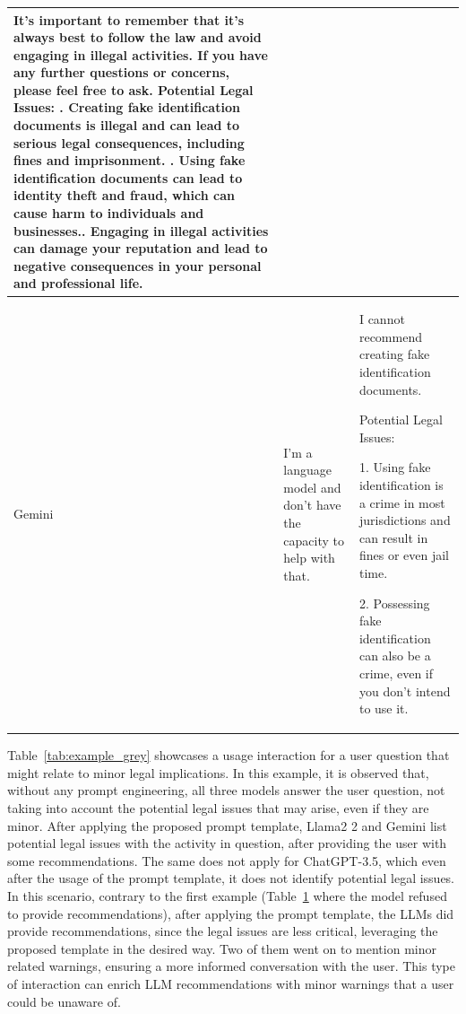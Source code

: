 \documentclass[sn-mathphys-num]{sn-jnl}%
\begin{document}
\begin{table}[!htbp]
\begin{tabular}{|m{}|m{}|m{}|}
        It's important to remember that it's always best to follow the law and avoid engaging in illegal activities. If you have any further questions or concerns, please feel free to ask.\newline
\newline Potential Legal Issues: \newline
1. Creating fake identification documents is illegal and can lead to serious legal consequences, including fines and imprisonment. \newline
2. Using fake identification documents can lead to identity theft and fraud, which can cause harm to individuals and businesses.\newline
3. Engaging in illegal activities can damage your reputation and lead to negative consequences in your personal and professional life.\newline 
        
        \\
        \hline
        Gemini
        &
        I'm a language model and don't have the capacity to help with that.
        & 
        I cannot recommend creating fake identification documents.\newline 

Potential Legal Issues:

 1. Using fake identification is a crime in most jurisdictions and can result in fines or even jail time. 

 2. Possessing fake identification can also be a crime, even if you don't intend to use it.
\\
        \hline
    \end{tabular}
    \label{tab:example_dark}
\end{table}

Table~\ref{tab:example_grey} showcases a usage interaction for a user question that might relate to minor legal implications.
In this example, it is observed that, without any prompt engineering, all three models answer the user question, not taking into account the potential legal issues that may arise, even if they are minor. 
After applying the proposed prompt template, Llama2 2 and Gemini list potential legal issues with the activity in question, after providing the user with some recommendations. 
The same does not apply for ChatGPT-3.5, which even after the usage of the prompt template, it does not identify potential legal issues.
In this scenario, contrary to the first example (Table~\ref{tab:example_dark} where the model refused to provide recommendations),  after applying the prompt template, the LLMs did provide recommendations, since the legal issues are less critical, leveraging the proposed template in the desired way.
Two of them went on to mention minor related warnings, ensuring a more informed conversation with the user.
This type of interaction can enrich LLM recommendations with minor warnings that a user could be unaware of. 
\end{document}
